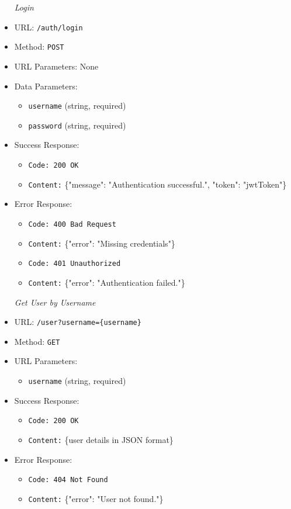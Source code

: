 \begin{itemize}
  \item[\textit{Login}]
  \item URL: \texttt{/auth/login}  
  \item Method: \texttt{POST}  
  \item URL Parameters: None  
  \item Data Parameters:
  \begin{itemize}
    \item \texttt{username} (string, required)
    \item \texttt{password} (string, required)
  \end{itemize}
  \item Success Response:
  \begin{itemize}
    \item \texttt{Code: 200 OK}  
    \item \texttt{Content:} \{"message": "Authentication successful.", "token": "jwtToken"\}
  \end{itemize}
  \item Error Response:
  \begin{itemize}
    \item \texttt{Code: 400 Bad Request}  
    \item \texttt{Content:} \{"error": "Missing credentials"\}
    \item \texttt{Code: 401 Unauthorized}  
    \item \texttt{Content:} \{"error": "Authentication failed."\}
  \end{itemize}
  
  \item[\textit{Get User by Username}]
  \item URL: \texttt{/user?username=\{username\}}  
  \item Method: \texttt{GET}  
  \item URL Parameters:
  \begin{itemize}
    \item \texttt{username} (string, required)
  \end{itemize}
  \item Success Response:
  \begin{itemize}
    \item \texttt{Code: 200 OK}  
    \item \texttt{Content:} \{user details in JSON format\}
  \end{itemize}
  \item Error Response:
  \begin{itemize}
    \item \texttt{Code: 404 Not Found}  
    \item \texttt{Content:} \{"error": "User not found."\}
  \end{itemize}


\end{itemize}
